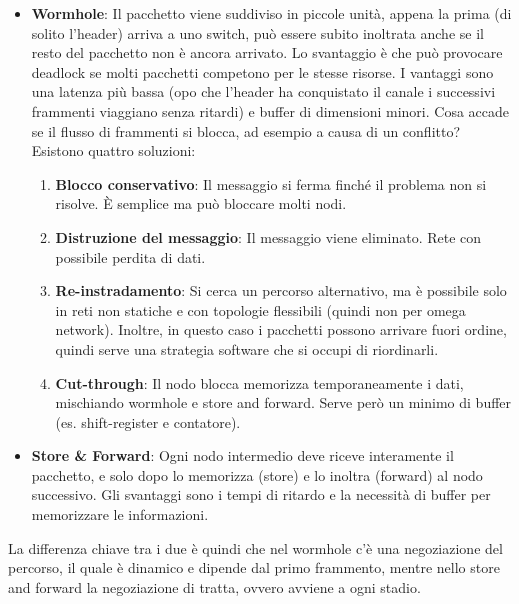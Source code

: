 \begin{itemize}
    \item \textbf{Wormhole}: Il pacchetto viene suddiviso in piccole unità, appena la prima (di solito l’header) arriva a uno switch, può essere subito inoltrata anche se il resto del pacchetto non è ancora arrivato. Lo svantaggio è che può provocare deadlock se molti pacchetti competono per le stesse risorse. I vantaggi sono una latenza più bassa (opo che l'header ha conquistato il canale i successivi frammenti viaggiano senza ritardi) e buffer di dimensioni minori. Cosa accade se il flusso di frammenti si blocca, ad esempio a causa di un conflitto? Esistono quattro soluzioni:
    \begin{enumerate}
        \item \textbf{Blocco conservativo}: Il messaggio si ferma finché il problema non si risolve. È semplice ma può bloccare molti nodi. 
        \item \textbf{Distruzione del messaggio}: Il messaggio viene eliminato. Rete con possibile perdita di dati.
        \item \textbf{Re-instradamento}: Si cerca un percorso alternativo, ma è possibile solo in reti non statiche e con topologie flessibili (quindi non per omega network). Inoltre, in questo caso i pacchetti possono arrivare fuori ordine, quindi serve una strategia software che si occupi di riordinarli. 
        \item \textbf{Cut-through}: Il nodo blocca memorizza temporaneamente i dati, mischiando wormhole e store and forward. Serve però un minimo di buffer (es. shift-register e contatore).
    \end{enumerate}
    \item \textbf{Store \& Forward}: Ogni nodo intermedio deve riceve interamente il pacchetto, e solo dopo lo memorizza (store) e lo inoltra (forward) al nodo successivo. Gli svantaggi sono i tempi di ritardo e la necessità di buffer per memorizzare le informazioni.
\end{itemize}
La differenza chiave tra i due è quindi che nel wormhole c'è una negoziazione del percorso, il quale è dinamico e dipende dal primo frammento, mentre nello store and forward  la negoziazione di tratta, ovvero avviene a ogni stadio.
